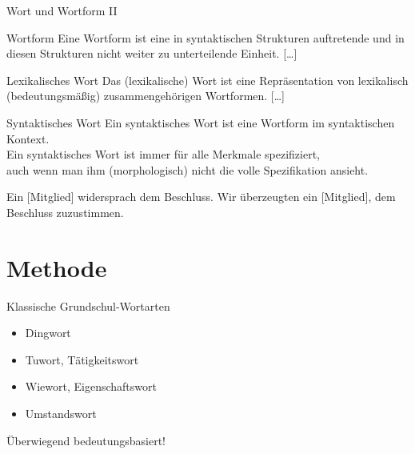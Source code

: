 \begin{frame}
  {Wort und Wortform II}
  \pause
  \begin{block}{Wortform}
    Eine \alert{Wortform} ist eine in syntaktischen Strukturen auftretende und in diesen Strukturen nicht weiter zu unterteilende Einheit.
    [\ldots]
  \end{block}
  \Zeile
  \pause
  \begin{block}{Lexikalisches Wort}
    Das (\alert{lexikalische}) \alert{Wort} ist eine Repräsentation von lexikalisch (bedeutungsmäßig) zusammengehörigen Wortformen.
    [\ldots]
  \end{block}
\end{frame}

\begin{frame}
  {Syntaktisches Wort}
  \onslide<+->
  \onslide<+->
  Ein \alert{syntaktisches Wort} ist eine \alert{Wortform} im syntaktischen Kontext.\\
  \Zeile
  \onslide<+->
  Ein syntaktisches Wort ist immer \alert{für alle Merkmale spezifiziert},\\
  auch wenn man ihm (morphologisch) nicht die volle Spezifikation ansieht.\\
  \Zeile
  \onslide<+->
  \begin{exe}
    \ex \alert{Ein [Mitglied]} widersprach dem Beschluss.
    \onslide<+->
    \ex Wir überzeugten \alert{ein [Mitglied]}, dem Beschluss zuzustimmen.
  \end{exe}
\end{frame}

\section{Methode}

\begin{frame}
  {Klassische Grundschul-Wortarten}
  \onslide<+->
    \begin{itemize}[<+->]
      \item Dingwort
      \item Tuwort, Tätigkeitswort
      \item Wiewort, Eigenschaftswort
      \item Umstandswort
    \end{itemize}
    \onslide<+->
    \Zeile
    Überwiegend \alert{bedeutungsbasiert}!
\end{frame}

